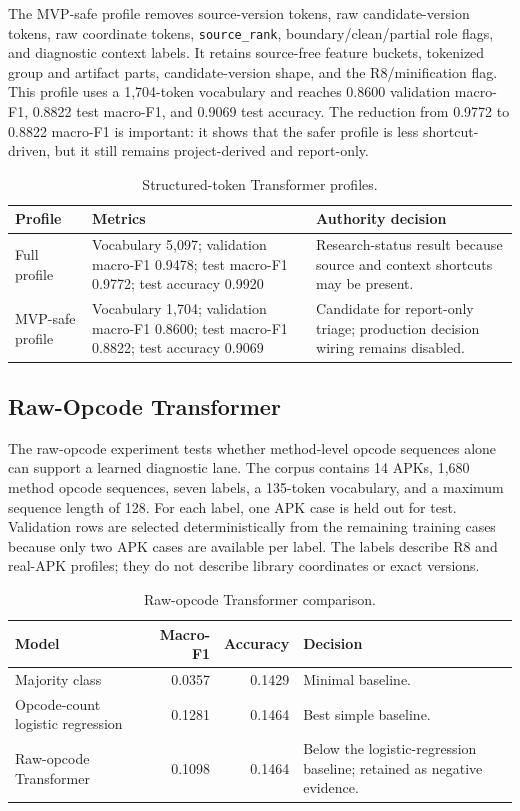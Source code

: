 The MVP-safe profile removes source-version tokens, raw candidate-version
tokens, raw coordinate tokens, \texttt{source\_rank}, boundary/clean/partial
role flags, and diagnostic context labels. It retains source-free feature
buckets, tokenized group and artifact parts, candidate-version shape, and the
R8/minification flag. This profile uses a 1,704-token vocabulary and reaches
0.8600 validation macro-F1, 0.8822 test macro-F1, and 0.9069 test accuracy.
The reduction from 0.9772 to 0.8822 macro-F1 is important: it shows that the
safer profile is less shortcut-driven, but it still remains project-derived
and report-only.

\begin{table}[H]
\centering
\caption{Structured-token Transformer profiles.}
\label{tab:pfe-ai-transformer-profiles}
\begin{tabularx}{\textwidth}{L{0.22\textwidth}L{0.25\textwidth}X}
\toprule
\textbf{Profile} & \textbf{Metrics} & \textbf{Authority decision}\\
\midrule
Full profile & Vocabulary 5,097; validation macro-F1 0.9478; test macro-F1
0.9772; test accuracy 0.9920 & Research-status result because source and
context shortcuts may be present.\\
MVP-safe profile & Vocabulary 1,704; validation macro-F1 0.8600; test
macro-F1 0.8822; test accuracy 0.9069 & Candidate for report-only triage;
production decision wiring remains disabled.\\
\bottomrule
\end{tabularx}
\end{table}

\subsection{Raw-Opcode Transformer}

The raw-opcode experiment tests whether method-level opcode sequences alone
can support a learned diagnostic lane. The corpus contains 14 APKs, 1,680
method opcode sequences, seven labels, a 135-token vocabulary, and a maximum
sequence length of 128. For each label, one APK case is held out for test.
Validation rows are selected deterministically from the remaining training
cases because only two APK cases are available per label. The labels describe
R8 and real-APK profiles; they do not describe library coordinates or exact
versions.

\begin{table}[H]
\centering
\caption{Raw-opcode Transformer comparison.}
\label{tab:pfe-ai-raw-opcode-results}
\begin{tabularx}{\textwidth}{L{0.38\textwidth}r r X}
\toprule
\textbf{Model} & \textbf{Macro-F1} & \textbf{Accuracy} &
\textbf{Decision}\\
\midrule
Majority class & 0.0357 & 0.1429 & Minimal baseline.\\
Opcode-count logistic regression & 0.1281 & 0.1464 & Best simple baseline.\\
Raw-opcode Transformer & 0.1098 & 0.1464 & Below the logistic-regression
baseline; retained as negative evidence.\\
\bottomrule
\end{tabularx}
\end{table}

